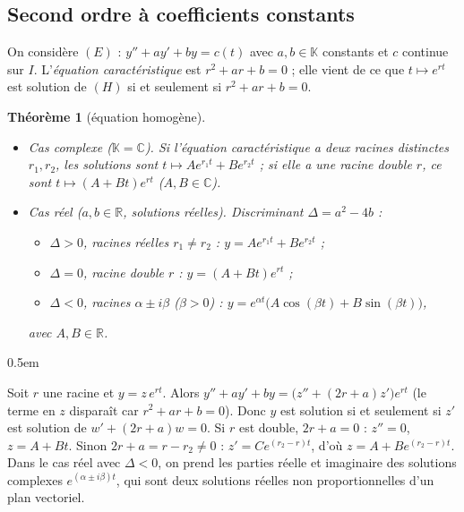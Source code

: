 \documentclass[a4paper,11pt]{article}
\makeatletter
\numberwithin{equation}{section}
\numberwithin{figure}{section}
\numberwithin{table}{section}
\theoremstyle{enonce}
\newtheorem{theoreme}[definition]{Théorème}
\theoremstyle{exemple}
\theoremstyle{remarque}
\renewcommand{\proofname}{Démonstration}
\renewenvironment{proof}[1][\proofname]{\par\pushQED{\qed}\normalfont
  \topsep0.5em\relax\trivlist\item[\hskip\labelsep\sffamily\itshape\color{Gris}#1.]\ignorespaces}
  {\popQED\endtrivlist\@endpefalse}
\newcommand{\K}{\mathbb{K}}
\newcommand{\R}{\mathbb{R}}
\newcommand{\C}{\mathbb{C}}
\makeatother
\begin{document}
\subsection{Second ordre à coefficients constants}\label{ss:constants}

On considère $(E)$ : $y''+ay'+by=c(t)$ avec $a,b\in\K$ constants et $c$ continue sur $I$. L'\emph{équation caractéristique}
est $r^2+ar+b=0$ ; elle vient de ce que $t\mapsto e^{rt}$ est solution de $(H)$ si et seulement si $r^2+ar+b=0$.

\begin{theoreme}[équation homogène]\label{t:caract}
\begin{itemize}
\item \emph{Cas complexe} ($\K=\C$). Si l'équation caractéristique a deux racines distinctes $r_1,r_2$, les solutions sont
$t\mapsto Ae^{r_1t}+Be^{r_2t}$ ; si elle a une racine double $r$, ce sont $t\mapsto(A+Bt)e^{rt}$ ($A,B\in\C$).
\item \emph{Cas réel} ($a,b\in\R$, solutions réelles). Discriminant $\Delta=a^2-4b$ :
\begin{itemize}
\item $\Delta>0$, racines réelles $r_1\neq r_2$ : $y=Ae^{r_1t}+Be^{r_2t}$ ;
\item $\Delta=0$, racine double $r$ : $y=(A+Bt)e^{rt}$ ;
\item $\Delta<0$, racines $\alpha\pm i\beta$ ($\beta>0$) : $y=e^{\alpha t}\big(A\cos(\beta t)+B\sin(\beta t)\big)$,
\end{itemize}
avec $A,B\in\R$.
\end{itemize}
\end{theoreme}

\begin{proof}
Soit $r$ une racine et $y=z\,e^{rt}$. Alors $y''+ay'+by=\big(z''+(2r+a)z'\big)e^{rt}$ (le terme en $z$ disparaît car
$r^2+ar+b=0$). Donc $y$ est solution si et seulement si $z'$ est solution de $w'+(2r+a)w=0$. Si $r$ est double, $2r+a=0$ :
$z''=0$, $z=A+Bt$. Sinon $2r+a=r-r_2\neq0$ : $z'=Ce^{(r_2-r)t}$, d'où $z=A+Be^{(r_2-r)t}$. Dans le cas réel avec $\Delta<0$,
on prend les parties réelle et imaginaire des solutions complexes $e^{(\alpha\pm i\beta)t}$, qui sont deux solutions réelles
non proportionnelles d'un plan vectoriel.
\end{proof}
\end{document}
